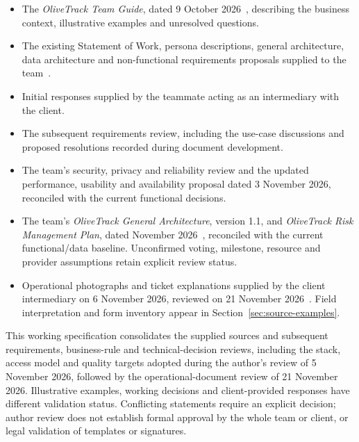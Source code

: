 \begin{itemize}

    \item The \emph{OliveTrack Team Guide},
    dated 9 October 2026~\cite{project-guide},
    describing the business context,
    illustrative examples and unresolved questions.

    \item The existing Statement of Work,
    persona descriptions, general architecture,
    data architecture and non-functional
    requirements proposals supplied to the team~\cite{project-baseline}.

    \item Initial responses supplied
    by the teammate acting as an intermediary
    with the client.

    \item The subsequent requirements review,
    including the use-case discussions
    and proposed resolutions recorded
    during document development.

    \item The team's security, privacy and reliability review and the updated
    performance, usability and availability proposal dated 3 November 2026,
    reconciled with the current functional decisions.

    \item The team's \emph{OliveTrack General Architecture}, version 1.1, and
    \emph{OliveTrack Risk Management Plan}, dated November 2026~\cite{project-architecture,project-risk}, reconciled with
    the current functional/data baseline. Unconfirmed voting, milestone, resource
    and provider assumptions retain explicit review status.

    \item Operational photographs and ticket explanations supplied by the client
    intermediary on 6 November 2026, reviewed on 21 November 2026~\cite{project-examples}. Field interpretation
    and form inventory appear in Section~\ref{sec:source-examples}.
\end{itemize}

This working specification consolidates the supplied sources and subsequent
requirements, business-rule and technical-decision reviews, including the
stack, access model and quality targets adopted during the author's review of
5 November 2026, followed by the operational-document review of 21 November 2026. Illustrative examples, working decisions and client-provided
responses have different validation status. Conflicting
statements require an explicit decision; author review does not establish formal
approval by the whole team or client, or legal validation of templates or signatures.

